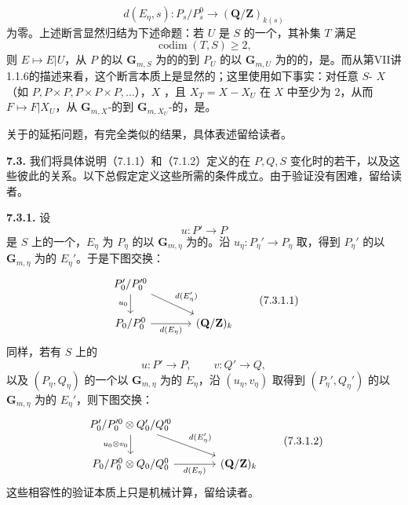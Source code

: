 \[
d(E_\eta,s):P_s/P_s^0\longrightarrow(\mathbf Q/\mathbf Z)_{k(s)}\tag{7.2.1}
\]
为零。上述断言显然归结为下述命题：若 $U$ 是 $S$ 的一个，其补集 $T$ 满足
\[
\operatorname{codim}(T,S)\geq2,
\]
则 $E\mapsto E|U$，从 $P$ 的以 $\mathbf G_{m,S}$ 为的的到 $P_U$ 的以 $\mathbf G_{m,U}$ 为的的，是。而从第VII讲1.1.6的描述来看，这个断言本质上是显然的；这里使用如下事实：对任意 $S$- $X$（如 $P,P\times P,P\times P\times P,\ldots$），$X$ ，且 $X_T=X-X_U$ 在 $X$ 中至少为 $2$，从而 $F\mapsto F|X_U$，从 $\mathbf G_{m,X}$-的到 $\mathbf G_{m,X_U}$-的，是。

关于的延拓问题，有完全类似的结果，具体表述留给读者。

\textbf{7.3.} 我们将具体说明（7.1.1）和（7.1.2）定义的在 $P,Q,S$ 变化时的若干，以及这些彼此的关系。以下总假定定义这些所需的条件成立。由于验证没有困难，留给读者。

\textbf{7.3.1.} 设
\[
u:P'\longrightarrow P
\]
是 $S$ 上的一个，$E_\eta$ 为 $P_\eta$ 的以 $\mathbf G_{m,\eta}$ 为的。沿 $u_\eta:P_\eta'\to P_\eta$ 取，得到 $P_\eta'$ 的以 $\mathbf G_{m,\eta}$ 为的 $E_\eta'$。于是下图交换：
\[
\begin{tikzcd}[column sep=large]
P_0'/P_0'^0\arrow[d,"u_0"']\arrow[dr,"d(E_\eta')"]&\\
P_0/P_0^0\arrow[r,"d(E_\eta)"']&(\mathbf Q/\mathbf Z)_k
\end{tikzcd}\tag{7.3.1.1}
\]
同样，若有 $S$ 上的
\[
u:P'\longrightarrow P,\qquad v:Q'\longrightarrow Q,
\]
以及 $(P_\eta,Q_\eta)$ 的一个以 $\mathbf G_{m,\eta}$ 为的 $E_\eta$，沿 $(u_\eta,v_\eta)$ 取得到 $(P_\eta',Q_\eta')$ 的以 $\mathbf G_{m,\eta}$ 为的 $E_\eta'$，则下图交换：
\[
\begin{tikzcd}[column sep=large]
P_0'/P_0'^0\otimes Q_0'/Q_0'^0
 \arrow[d,"u_0\otimes v_0"']\arrow[dr,"d(E_\eta')"]&\\
P_0/P_0^0\otimes Q_0/Q_0^0\arrow[r,"d(E_\eta)"']&(\mathbf Q/\mathbf Z)_k
\end{tikzcd}\tag{7.3.1.2}
\]
这些相容性的验证本质上只是机械计算，留给读者。

